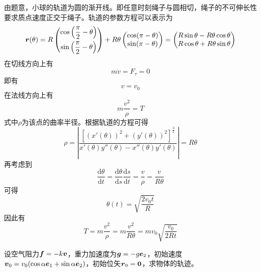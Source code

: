 \begin{solution}
由题意，小球的轨道为圆的渐开线。即任意时刻绳子与圆相切，绳子的不可伸长性要求质点速度正交于绳子。轨道的参数方程可以表示为
\begin{equation*}
	\boldsymbol{r}(\theta) = R \begin{pmatrix} \cos\left(\dfrac{\pi}{2}-\theta\right) \\[1.5ex] \sin \left(\dfrac{\pi}{2}-\theta\right) \end{pmatrix} + R\theta \begin{pmatrix} \cos(\pi-\theta) \\ \sin(\pi-\theta) \end{pmatrix} = \begin{pmatrix} R\sin \theta-R\theta\cos \theta \\ R\cos \theta+R\theta \sin \theta \end{pmatrix}
\end{equation*}
在切线方向上有
\begin{equation*}
	m\dot{v} = F_\tau = 0
\end{equation*}
即有
\begin{equation*}
	v = v_0
\end{equation*}
在法线方向上有
\begin{equation*}
	m \frac{v^2}{\rho} = T
\end{equation*}
式中$\rho$为该点的曲率半径。根据轨道的方程可得
\begin{equation*}
	\rho = \left|\frac{\left[(x'(\theta))^2+(y'(\theta))^2\right]^{\frac32}}{x'(\theta)y''(\theta)-x''(\theta)y'(\theta)}\right| = R\theta
\end{equation*}
再考虑到
\begin{equation*}
	\frac{\mathrm{d} \theta}{\mathrm{d} t} = \frac{\mathrm{d} \theta}{\mathrm{d} s} \frac{\mathrm{d} s}{\mathrm{d} t} = \frac{v}{\rho} = \frac{v}{R\theta}
\end{equation*}
可得
\begin{equation*}
	\theta(t) = \sqrt{\frac{2v_0t}{R}}
\end{equation*}
因此有
\begin{equation*}
	T = m\frac{v^2}{\rho} = m\frac{v^2}{R\theta} = mv_0 \sqrt{\frac{v_0}{2Rt}}
\end{equation*}
\end{solution}

\begin{example}[计入空气阻力的斜抛运动]
设空气阻力$\boldsymbol{f} = -k\boldsymbol{v}$，重力加速度为$\boldsymbol{g} = -g\boldsymbol{e}_2$，初始速度$\boldsymbol{v}_0 = v_0(\cos \alpha \boldsymbol{e}_1 + \sin \alpha \boldsymbol{e}_2)$，初始位矢$\boldsymbol{r}_0 = \boldsymbol{0}$，求物体的轨迹。
\end{example}

